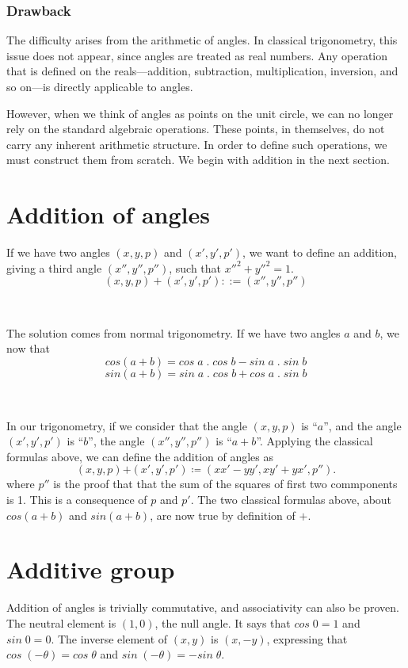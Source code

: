 \documentclass[11pt]{article}
\theoremstyle{definition}
\begin{document}
\subsubsection*{Drawback}

The difficulty arises from the arithmetic of angles. In classical
trigonometry, this issue does not appear, since angles are treated as
real numbers. Any operation that is defined on the reals—addition,
subtraction, multiplication, inversion, and so on—is directly
applicable to angles.

However, when we think of angles as points on the unit circle, we can
no longer rely on the standard algebraic operations. These points, in
themselves, do not carry any inherent arithmetic structure. In order
to define such operations, we must construct them from scratch. We
begin with addition in the next section.

\section{Addition of angles}

If we have two angles $(x, y, p)$ and $(x', y', p')$, we want to
define an addition, giving a third angle $(x'', y'', p'')$, such that
$x''^2+y''^2=1$.
\[
(x, y, p) + (x', y', p') ::= (x'', y'', p'')
\]

\

\noindent The solution comes from normal trigonometry. If we have two
angles $a$ and $b$, we now that
\[
cos(a+b) = cos\;a\;.\;cos\;b - sin\;a\;.\;sin\;b
\]
\[
sin(a+b) = sin\;a\;.\;cos\;b + cos\;a\;.\;sin\;b
\]

\

\noindent In our trigonometry, if we consider that the angle $(x, y,
p)$ is ``$a$'', and the angle $(x', y', p')$ is ``$b$'', the angle
$(x'', y'', p'')$ is ``$a + b$''. Applying the classical formulas
above, we can define the addition of angles as
\[
(x, y, p) \boldsymbol{+} (x', y', p') \coloneqq (x x' - y y', x y' + y
x', p'').
\]
where $p''$ is the proof that that the sum of the squares of first two
commponents is 1. This is a consequence of $p$ and $p'$. The two
classical formulas above, about $cos(a+b)$ and $sin(a+b)$, are now
true by definition of $+$.

\section{Additive group}

Addition of angles is trivially commutative, and associativity can
also be proven. The neutral element is $(1, 0)$, the null angle. It
says that $cos\;0=1$ and $sin\;0=0$. The inverse element of $(x, y)$
is $(x, -y)$, expressing that $cos\;(- \theta) = cos\;\theta$ and
$sin\;(- \theta) = - sin\;\theta$.
\end{document}
